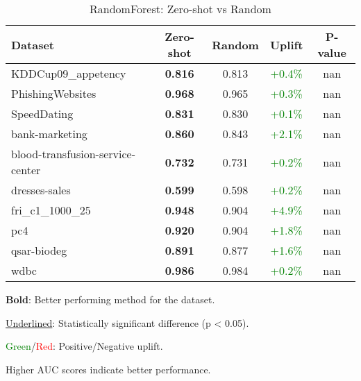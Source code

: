 \begin{table}[htbp]
\centering
\caption{RandomForest: Zero-shot vs Random}
\label{tab:randomforest_zeroshot_vs_random}
\begin{tabular}{lcccc}
\toprule
Dataset & Zero-shot & Random & Uplift & P-value \\
\midrule
KDDCup09\_appetency & \textbf{0.816} & 0.813 & \textcolor{green}{+0.4\%} & nan \\
PhishingWebsites & \textbf{0.968} & 0.965 & \textcolor{green}{+0.3\%} & nan \\
SpeedDating & \textbf{0.831} & 0.830 & \textcolor{green}{+0.1\%} & nan \\
bank-marketing & \textbf{0.860} & 0.843 & \textcolor{green}{+2.1\%} & nan \\
blood-transfusion-service-center & \textbf{0.732} & 0.731 & \textcolor{green}{+0.2\%} & nan \\
dresses-sales & \textbf{0.599} & 0.598 & \textcolor{green}{+0.2\%} & nan \\
fri\_c1\_1000\_25 & \textbf{0.948} & 0.904 & \textcolor{green}{+4.9\%} & nan \\
pc4 & \textbf{0.920} & 0.904 & \textcolor{green}{+1.8\%} & nan \\
qsar-biodeg & \textbf{0.891} & 0.877 & \textcolor{green}{+1.6\%} & nan \\
wdbc & \textbf{0.986} & 0.984 & \textcolor{green}{+0.2\%} & nan \\
\bottomrule
\end{tabular}
\begin{tablenotes}
\small
\item \textbf{Bold}: Better performing method for the dataset.
\item \underline{Underlined}: Statistically significant difference (p < 0.05).
\item \textcolor{green}{Green}/\textcolor{red}{Red}: Positive/Negative uplift.
\item Higher AUC scores indicate better performance.
\end{tablenotes}
\end{table}